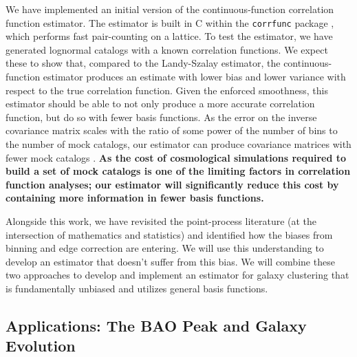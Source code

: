\documentclass[12pt, fullpage, letterpaper]{article}
\begin{document}
We have implemented an initial version of the continuous-function correlation function estimator.
The estimator is built in C within the \texttt{corrfunc} package \citep{Sinha2017}, which performs fast pair-counting on a lattice.
To test the estimator, we have generated lognormal catalogs with a known correlation functions. 
We expect these to show that, compared to the Landy-Szalay
  estimator, the continuous-function estimator produces an estimate with lower bias and
  lower variance with respect to the true correlation function.
Given the enforced smoothness, this estimator should be able to not only produce a more accurate correlation function, but do so with fewer basis functions.
As the error on the inverse covariance matrix scales with the ratio of some power of the number of bins to the number of mock catalogs, our estimator can produce covariance matrices with fewer mock catalogs \citep{Hartlap2007}.
\textbf{As the cost of cosmological simulations required to build a set of mock catalogs is one of the limiting factors in correlation function analyses; our estimator will significantly reduce this cost by containing more information in fewer basis functions.}

Alongside this work, we have revisited the point-process literature (at the intersection of mathematics and statistics) and identified how the biases from binning and edge correction are entering. 
We will use this understanding to develop an estimator that doesn't suffer from this bias.
We will combine these two approaches to develop and implement an estimator for galaxy clustering that is fundamentally unbiased and utilizes general basis functions.

\subsection{Applications: The BAO Peak and Galaxy Evolution}
\end{document}
